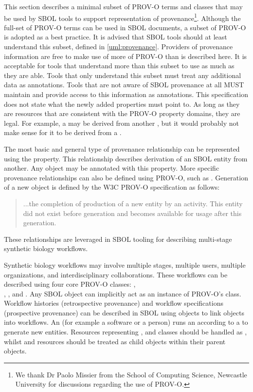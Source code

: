 This section describes a minimal subset of PROV-O terms and classes that may be used by SBOL tools to support representation of provenance\footnote{We thank Dr Paolo Missier from the School of Computing Science, Newcastle University for discussions regarding the use of PROV-O.}. Although the full-set of PROV-O terms can be used in SBOL documents, a subset of PROV-O is adopted as a best practice. It is advised that SBOL tools should at least understand this subset, defined in \ref{uml:provenance}. Providers of provenance information are free to make use of more of PROV-O than is described here. It is acceptable for tools that understand more than this subset to use as much as they are able. Tools that only understand this subset must treat any additional data as annotations. Tools that are not aware of SBOL provenance at all MUST maintain and provide access to this information as annotations. This specification does not state what the newly added properties must point to. As long as they are resources that are consistent with the PROV-O property domains, they are legal. For example, a  may be derived from another , but it would probably not make sense for it to be derived from a .

The most basic and general type of provenance relationship can be represented using the  property. This relationship describes derivation of an SBOL entity from another. 
Any  object may be annotated with this property. More specific provenance relationships can also be defined using PROV-O, such as . Generation of a new object is defined by the W3C PROV-O specification as follows:
\begin{quote}
	...the completion of production of a new entity by an activity. This entity did not exist before generation and becomes available for usage after this generation.
\end{quote}
These relationships are leveraged in SBOL tooling for describing multi-stage synthetic biology workflows.

Synthetic biology workflows may involve multiple stages, multiple users, multiple organizations, and interdisciplinary collaborations. These workflows can be described using four core PROV-O classes: , \\ , , and . Any SBOL  object can implicitly act as an instance of PROV-O's  class. Workflow histories (retrospective provenance) and workflow specifications (prospective provenance) can be described in SBOL using  objects to link  objects into workflows. An  (for example a software or a person) runs an  according to a  to generate new entities. Resources representing ,  and  classes should be handled as , whilst  and  resources should be treated as child  objects within their parent  objects.  

